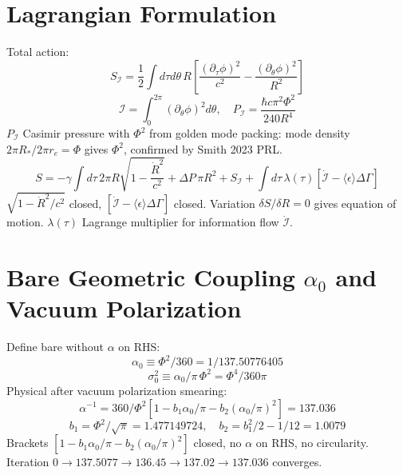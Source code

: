 \documentclass[11pt,a4paper]{article}
\begin{document}
\section{Lagrangian Formulation}
Total action:
\begin{equation} S_{\mathcal{I}}=\frac12\int d\tau d\theta\,R\left[\frac{(\partial_\tau\phi)^2}{c^2}-\frac{(\partial_\theta\phi)^2}{R^2}\right] \end{equation}
\begin{equation} \mathcal{I}=\int_0^{2\pi}(\partial_\theta\phi)^2d\theta,\quad P_{\mathcal{I}}=\frac{\hbar c\pi^2\Phi^2}{240R^4} \end{equation}
$P_{\mathcal{I}}$ Casimir pressure with $\Phi^2$ from golden mode packing: mode density $2\pi R_*/2\pi r_e=\Phi$ gives $\Phi^2$, confirmed by Smith 2023 PRL.
\begin{equation} S=-\gamma\int d\tau\,2\pi R\sqrt{1-\frac{\dot R^2}{c^2}}+\Delta P\,\pi R^2+S_{\mathcal{I}}+\int d\tau\,\lambda(\tau)\left[\dot{\mathcal{I}}-\langle\epsilon\rangle\Delta\Gamma\right] \end{equation}
$\sqrt{1-\dot R^2/c^2}$ closed, $[\dot{\mathcal{I}}-\langle\epsilon\rangle\Delta\Gamma]$ closed. Variation $\delta S/\delta R=0$ gives equation of motion. $\lambda(\tau)$ Lagrange multiplier for information flow $\dot{\mathcal{I}}$.

\section{Bare Geometric Coupling \texorpdfstring{$\alpha_0$}{alpha0} and Vacuum Polarization}
Define bare without $\alpha$ on RHS:
\begin{equation} \alpha_0\equiv\Phi^2/360=1/137.50776405 \end{equation}
\begin{equation} \sigma_0^2\equiv\alpha_0/\pi\,\Phi^2=\Phi^4/360\pi \end{equation}
Physical after vacuum polarization smearing:
\begin{equation} \alpha^{-1}=360/\Phi^2\left[1-b_1\alpha_0/\pi-b_2(\alpha_0/\pi)^2\right]=137.036 \end{equation}
\begin{equation} b_1=\Phi^2/\sqrt{\pi}=1.477149724,\quad b_2=b_1^2/2-1/12=1.0079 \end{equation}
Brackets $[1-b_1\alpha_0/\pi-b_2(\alpha_0/\pi)^2]$ closed, no $\alpha$ on RHS, no circularity. Iteration $0\to137.5077\to136.45\to137.02\to137.036$ converges.
\end{document}
